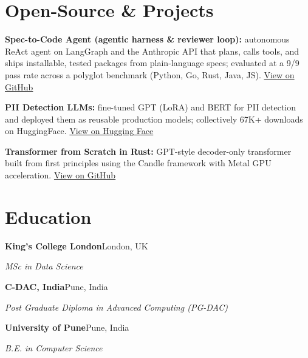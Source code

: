 \documentclass[10pt,a4paper]{article}
\begin{document}
\section{Open-Source \& Projects}
\begin{tight}
  \item \textbf{Spec-to-Code Agent (agentic harness \& reviewer loop):} autonomous ReAct agent on LangGraph and the Anthropic API that plans, calls tools, and ships installable, tested packages from plain-language specs; evaluated at a 9/9 pass rate across a polyglot benchmark (Python, Go, Rust, Java, JS). \href{https://github.com/abhijeetscode/Spec-to-Code-Agent}{View on GitHub}
  \item \textbf{PII Detection LLMs:} fine-tuned GPT (LoRA) and BERT for PII detection and deployed them as reusable production models; collectively 67K+ downloads on HuggingFace. \href{https://huggingface.co/ab-ai/pii_model}{View on Hugging Face}
  \item \textbf{Transformer from Scratch in Rust:} GPT-style decoder-only transformer built from first principles using the Candle framework with Metal GPU acceleration. \href{https://github.com/abhijeetscode/transformer-rust}{View on GitHub}
\end{tight}

\section{Education}
{\color{company}\bfseries King's College London}\hfill {\color{muted}London, UK}\par
{\itshape MSc in Data Science}\par\vspace{2pt}
{\color{company}\bfseries C-DAC, India}\hfill {\color{muted}Pune, India}\par
{\itshape Post Graduate Diploma in Advanced Computing (PG-DAC)}\par\vspace{2pt}
{\color{company}\bfseries University of Pune}\hfill {\color{muted}Pune, India}\par
{\itshape B.E. in Computer Science}\par
\end{document}
